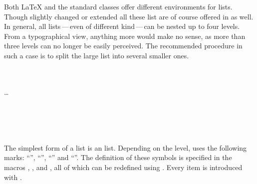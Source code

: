 Both {\LaTeX} and the standard classes offer different environments for
lists. Though slightly changed or extended all these list are of course
offered in {\KOMAScript} as well. In general, all lists\,---\,even of different
kind\,---\,can be nested up to four levels. From a typographical view,
anything more would make no sense, as more than three levels can no longer be
easily perceived. The recommended procedure in such a case is
to split the large list into several smaller ones.


\ifCommonscrextend\else
\begin{Declaration}
  \\
  \quad{}\\
  \quad\dots\\
  \\
  \\
  \\
  \\
\end{Declaration}%
%
%
%
%
%
%
The simplest form of a list is an  list.
\iffalse %
The users of a certain disliked word processing package often refer to
this form of a list as \emph{bulletpoints}.  Presumably, these users
are unable to envisage that, depending on the level, a different
symbol from a large dot could be used to introduce each
point. %
\fi%
Depending on the level, {\KOMAScript} uses the following marks:
``{}'', ``{}'', ``{}'' and
``{}''. The definition of these symbols is specified in
the macros , ,
 and , all of which can be
redefined using . Every item is introduced with
.%
%
\ifCommonmaincls

